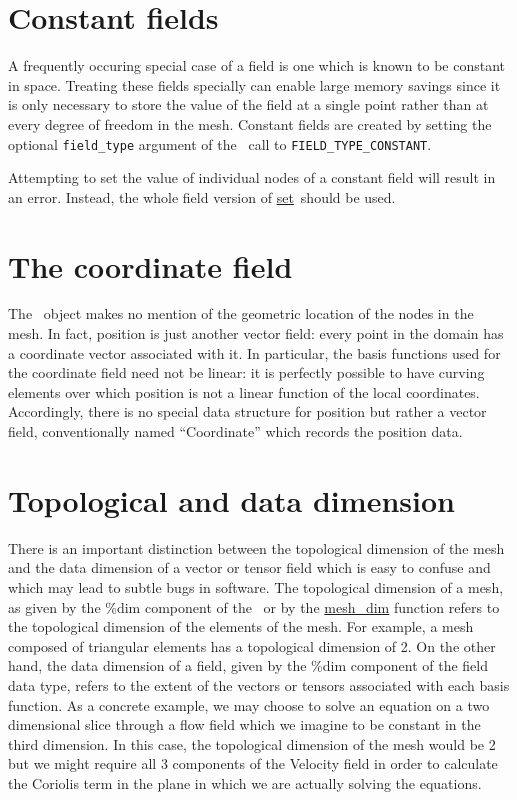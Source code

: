 \documentclass[a4paper, 11pt]{book}
\begin{document}
\section{Constant fields}

A frequently occuring special case of a field is one which is known to be
constant in space. Treating these fields specially can enable large memory
savings since it is only necessary to store the value of the field at a
single point rather than at every degree of freedom in the mesh. Constant
fields are created by setting the optional \lstinline+field_type+ argument
of the \allocate\ call to \lstinline+FIELD_TYPE_CONSTANT+.

Attempting to set the value of individual nodes of a constant field will
result in an error. Instead, the whole field version of
\hyperlink{proc:fieldset}{set}\ should be used.

\section{The coordinate field}

The \meshtype\ object makes no mention of the geometric location of the
nodes in the mesh. In fact, position is just another vector field: every
point in the domain has a coordinate vector associated with it. In
particular, the basis functions used for the coordinate field need not be
linear: it is perfectly possible to have curving elements over which
position is not a linear function of the local coordinates. Accordingly,
there is no special data structure for position but rather a vector field,
conventionally named ``Coordinate'' which records the position data.


\section{Topological and data dimension}

There is an important distinction between the topological dimension of the
mesh and the data dimension of a vector or tensor field which is easy to
confuse and which may lead to subtle bugs in software. The topological
dimension of a mesh, as given by the \%dim component of the \meshtype\ or by
the \hyperlink{proc:meshdim}{mesh\_dim} function refers to the topological
dimension of the elements of the mesh. For example, a mesh composed of
triangular elements has a topological dimension of 2. On the other hand, the
data dimension of a field, given by the \%dim component of the field data
type, refers to the extent of the vectors or tensors associated with each
basis function. As a concrete example, we may choose to solve an equation on
a two dimensional slice through a flow field which we imagine to be constant
in the third dimension. In this case, the topological dimension of the mesh
would be 2 but we might require all 3 components of the Velocity field in
order to calculate the Coriolis term in the plane in which we are actually
solving the equations.
\end{document}
